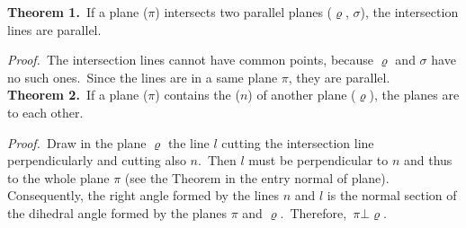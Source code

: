 \documentclass[12pt]{article}
\theoremstyle{definition}
\begin{document}
\textbf{Theorem 1.}\, If a plane ($\pi$) intersects two parallel planes ($\varrho$, $\sigma$), the intersection lines are parallel.

{\em Proof.}\, The intersection lines cannot have common points, because $\varrho$ and $\sigma$ have no such ones.\, Since the lines are in a same plane $\pi$, they are parallel.\\


\textbf{Theorem 2.}\, If a plane ($\pi$) contains the  ($n$) of another plane ($\varrho$), the planes are  to each other.

{\em Proof.}\, Draw in the plane $\varrho$ the line $l$ cutting the intersection line perpendicularly and cutting also $n$.\, Then $l$ must be perpendicular to $n$ and thus to the whole plane $\pi$ (see the Theorem in the entry normal of plane).\, Consequently, the right angle formed by the lines $n$ and $l$ is the normal section of the dihedral angle formed by the planes $\pi$ and $\varrho$.\, Therefore,\, $\pi \bot \varrho$.
\end{document}
